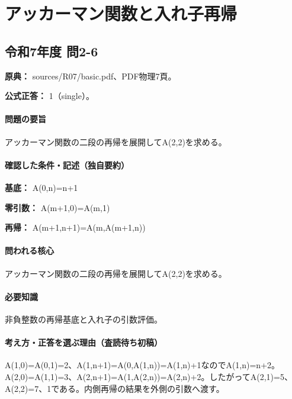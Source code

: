 \section{アッカーマン関数と入れ子再帰}

\subsection{令和7年度 問2-6}
\label{q:r07-reg-basic-2-6}

\noindent\textbf{原典：} sources/R07/basic.pdf、PDF物理7頁。

\textbf{公式正答：} 1（single）。

\paragraph{問題の要旨} アッカーマン関数の二段の再帰を展開してA(2,2)を求める。

\paragraph{確認した条件・記述（独自要約）}\mbox{}\par

\noindent\textbf{基底：} A(0,n)=\allowbreak{}n+1\par

\noindent\textbf{零引数：} A(m+1,0)=\allowbreak{}A(m,1)\par

\noindent\textbf{再帰：} A(m+1,n+1)=\allowbreak{}A(m,A(m+1,n))\par

\paragraph{問われる核心} アッカーマン関数の二段の再帰を展開してA(2,2)を求める。

\paragraph{必要知識} 非負整数の再帰基底と入れ子の引数評価。

\paragraph{考え方・正答を選ぶ理由（査読待ち初稿）} A(1,0)=\allowbreak{}A(0,1)=\allowbreak{}2、A(1,n+1)=\allowbreak{}A(0,A(1,n))=\allowbreak{}A(1,n)+1なのでA(1,n)=\allowbreak{}n+2。A(2,0)=\allowbreak{}A(1,1)=\allowbreak{}3、A(2,n+1)=\allowbreak{}A(1,A(2,n))=\allowbreak{}A(2,n)+2。したがってA(2,1)=\allowbreak{}5、A(2,2)=\allowbreak{}7、1である。内側再帰の結果を外側の引数へ渡す。

